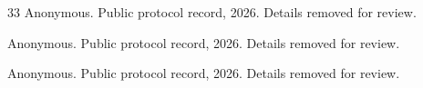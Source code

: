 \documentclass[12pt,letterpaper]{article}
\begin{document}
\begin{thebibliography}{33}
{Anonymous}.
\newblock Public protocol record, 2026{}.
\newblock Details removed for review.

{Anonymous}.
\newblock Public protocol record, 2026{}.
\newblock Details removed for review.

{Anonymous}.
\newblock Public protocol record, 2026{}.
\newblock Details removed for review.

\end{thebibliography}
\end{document}

